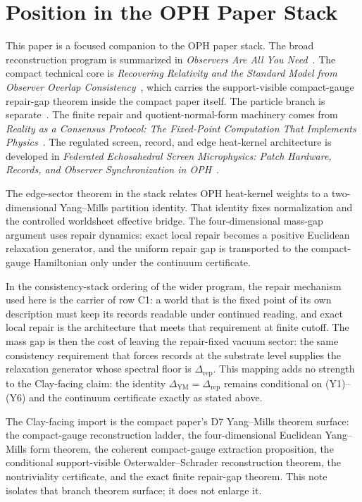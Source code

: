 \documentclass[11pt]{article}
\numberwithin{equation}{section}
\theoremstyle{remark}
\newcommand{\YM}{\mathrm{YM}}
\begin{document}
\section{Position in the OPH Paper Stack}

This paper is a focused companion to the OPH paper stack. The broad reconstruction program is
summarized in \emph{Observers Are All You Need}~\cite{oph1}. The compact technical core is
\emph{Recovering Relativity and the Standard Model from Observer Overlap Consistency}~\cite{oph2},
which carries the support-visible compact-gauge repair-gap theorem inside the compact paper
itself. The particle branch is separate~\cite{oph3}. The finite repair and quotient-normal-form
machinery comes from \emph{Reality as a Consensus Protocol: The Fixed-Point Computation That
Implements Physics}~\cite{oph4}. The regulated screen, record, and edge heat-kernel architecture is
developed in \emph{Federated Echosahedral Screen Microphysics: Patch Hardware, Records, and
Observer Synchronization in OPH}~\cite{oph5}.

The edge-sector theorem in the stack relates OPH heat-kernel weights to a two-dimensional
Yang--Mills partition identity. That identity fixes normalization and the controlled worldsheet
effective bridge. The four-dimensional mass-gap argument uses repair dynamics: exact local repair
becomes a positive Euclidean relaxation generator, and the uniform repair gap is transported to the
compact-gauge Hamiltonian only under the continuum certificate.

In the consistency-stack ordering of the wider program, the repair mechanism used here is the
carrier of row C1: a world that is the fixed point of its own description must
keep its records readable under continued reading, and exact local repair is
the architecture that meets that requirement at finite cutoff. The mass gap is
then the cost of leaving the repair-fixed vacuum sector: the same
consistency requirement that forces records at the substrate level supplies
the relaxation generator whose spectral floor is \(\Delta_{\mathrm{rep}}\).
This mapping adds no strength to the Clay-facing claim: the identity
\(\Delta_{\YM}=\Delta_{\mathrm{rep}}\) remains conditional on (Y1)--(Y6) and
the continuum certificate exactly as stated above.

The Clay-facing import is the compact paper's D7 Yang--Mills theorem surface: the compact-gauge
reconstruction ladder, the four-dimensional Euclidean Yang--Mills form theorem, the coherent
compact-gauge extraction proposition, the conditional support-visible Osterwalder--Schrader
reconstruction theorem, the nontriviality certificate, and the exact finite repair-gap theorem.
This note isolates that branch theorem surface; it does not enlarge it.
\end{document}
